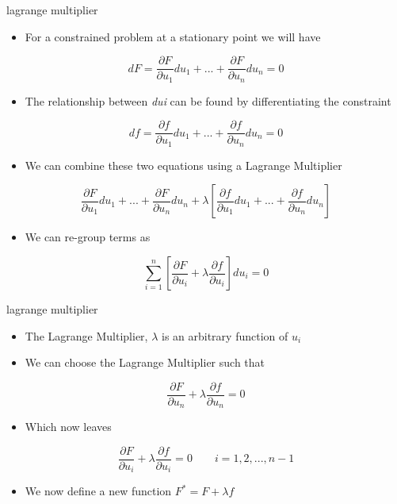 \documentclass[
  letterpaper,
  ignorenonframetext,
  aspectratio=43,
  handout,
  12pt]{beamer}
\providecommand{\tightlist}{%
  \setlength{\itemsep}{0pt}\setlength{\parskip}{0pt}}
\providecommand{\tightlist}{%
\setlength{\itemsep}{0pt}\setlength{\parskip}{0pt}}
\begin{document}
\begin{frame}{lagrange multiplier}
\protect\hypertarget{lagrange-multiplier}{}
\begin{itemize}
\tightlist
\item
  For a constrained problem at a stationary point we will have
\end{itemize}

\[dF = \frac{\partial F}{\partial u_1} du_1 + ... + \frac{\partial F}{\partial u_n} du_n = 0\]

\begin{itemize}
\tightlist
\item
  The relationship between \emph{du}\emph{i} can be found by
  differentiating the constraint
\end{itemize}

\[df = \frac{\partial f}{\partial u_1} du_1 + ... + \frac{\partial f}{\partial u_n} du_n = 0\]

\begin{itemize}
\tightlist
\item
  We can combine these two equations using a Lagrange Multiplier
\end{itemize}

\[\frac{\partial F}{\partial u_1} du_1 + ... + \frac{\partial F}{\partial u_n} du_n + \lambda \left[\frac{\partial f}{\partial u_1} du_1 + ... + \frac{\partial f}{\partial u_n} du_n \right]\]

\begin{itemize}
\tightlist
\item
  We can re-group terms as
\end{itemize}

\[\sum_{i=1}^n \left[\frac{\partial F}{\partial u_i} + \lambda \frac{\partial f}{\partial u_i} \right]du_i = 0\]
\end{frame}

\begin{frame}{lagrange multiplier}
\protect\hypertarget{lagrange-multiplier-1}{}
\begin{itemize}
\tightlist
\item
  The Lagrange Multiplier, \(\lambda\) is an arbitrary function of
  \(u_i\)
\item
  We can choose the Lagrange Multiplier such that
\end{itemize}

\[\frac{\partial F}{\partial u_n} + \lambda \frac{\partial f}{\partial u_n}  = 0\]

\begin{itemize}
\tightlist
\item
  Which now leaves
\end{itemize}

\[\frac{\partial F}{\partial u_i} + \lambda \frac{\partial f}{\partial u_i} = 0 \qquad i=1,2,...,n-1\]

\begin{itemize}
\tightlist
\item
  We now define a new function \(F^* = F + \lambda f\)
\end{itemize}
\end{frame}
\end{document}
